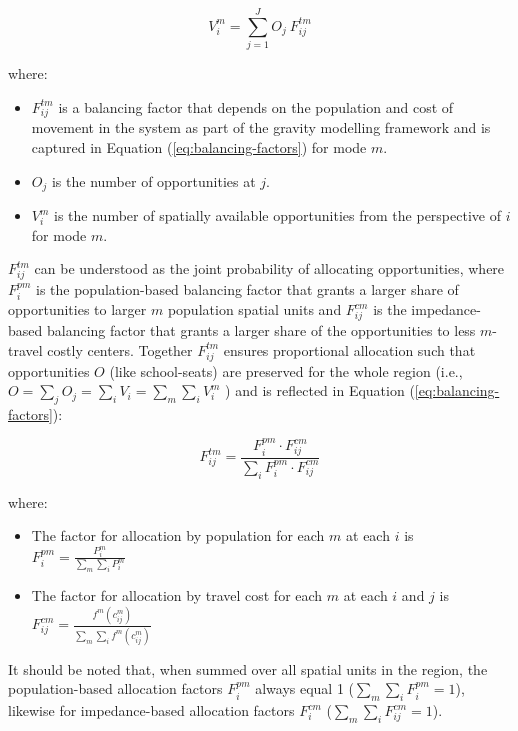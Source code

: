 \documentclass[
default
]{sn-jnl}
\providecommand{\tightlist}{%
  \setlength{\itemsep}{0pt}\setlength{\parskip}{0pt}}\usepackage{longtable,booktabs,array}
\begin{document}
\begin{equation}
\label{eq:spatial-availability}
V_{i}^{m} = \sum_{j=1}^J O_j\ F^{tm}_{ij}
\end{equation}

\noindent where:

\begin{itemize}
\tightlist
\item
  \(F^{tm}_{ij}\) is a balancing factor that depends on the population
  and cost of movement in the system as part of the gravity modelling
  framework and is captured in Equation (\ref{eq:balancing-factors}) for
  mode \(m\).
\item
  \(O_j\) is the number of opportunities at \(j\).
\item
  \(V_i^m\) is the number of spatially available opportunities from the
  perspective of \(i\) for mode \(m\).
\end{itemize}

\(F^{tm}_{ij}\) can be understood as the joint probability of allocating
opportunities, where \(F^{pm}_{i}\) is the population-based balancing
factor that grants a larger share of opportunities to larger \(m\)
population spatial units and \(F^{cm}_{ij}\) is the impedance-based
balancing factor that grants a larger share of the opportunities to less
\(m\)-travel costly centers. Together \(F^{tm}_{ij}\) ensures
proportional allocation such that opportunities \(O\) (like
school-seats) are preserved for the whole region (i.e.,
\(O = \sum_{j} O_j = \sum_{i} V_i = \sum_{m}\sum_{i} V_i^m\) ) and is
reflected in Equation (\ref{eq:balancing-factors}):

\begin{equation}
\label{eq:balancing-factors}
F^{tm}_{ij} = \frac{F^{pm}_{i} \cdot F^{cm}_{ij}}{\sum_{i} F^{pm}_{i} \cdot F^{cm}_{ij}}
\end{equation}

\noindent where:

\begin{itemize}
\tightlist
\item
  The factor for allocation by population for each \(m\) at each \(i\)
  is \(F^{pm}_{i} = \frac{P_{i}^m}{\sum_{m}\sum_{i} P_{i}^m}\)
\item
  The factor for allocation by travel cost for each \(m\) at each \(i\)
  and \(j\) is
  \(F^{cm}_{ij} = \frac{f^m(c^m_{ij})}{\sum_{m}\sum_{i} f^m(c^m_{ij})}\)
\end{itemize}

It should be noted that, when summed over all spatial units in the
region, the population-based allocation factors \(F^{pm}_{i}\) always
equal 1 (\(\sum_{m}\sum_{i} F^{pm}_{i}= 1\)), likewise for
impedance-based allocation factors \(F^{cm}_{i}\)
(\(\sum_{m}\sum_{i} F^{cm}_{ij} = 1\)).
\end{document}
